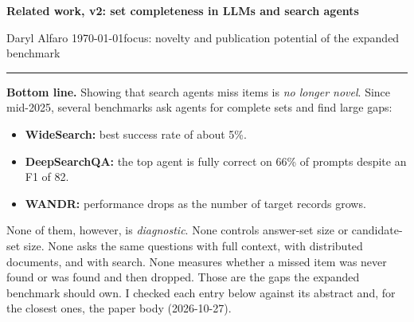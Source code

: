 \documentclass[10pt]{article}
\begin{document}
{\Large\textbf{Related work, v2: set completeness in LLMs and search agents}}\par
\vspace{2pt}
Daryl Alfaro \quad\textbullet\quad \today \quad\textbullet\quad focus: novelty and publication potential of the
expanded benchmark\par
\vspace{-2pt}\rule{\linewidth}{0.4pt}

\textbf{Bottom line.} Showing that search agents miss items is \emph{no longer novel}. Since mid-2025, several
benchmarks ask agents for complete sets and find large gaps:
\begin{itemize}
\item \textbf{WideSearch:} best success rate of about 5\%.
\item \textbf{DeepSearchQA:} the top agent is fully correct on 66\% of prompts despite an F1 of 82.
\item \textbf{WANDR:} performance drops as the number of target records grows.
\end{itemize}
None of them, however, is \emph{diagnostic}. None controls answer-set size or candidate-set size. None asks the
same questions with full context, with distributed documents, and with search. None measures whether a missed
item was never found or was found and then dropped. Those are the gaps the expanded benchmark should own. I
checked each entry below against its abstract and, for the closest ones, the paper body (2026-10-27).
\end{document}
